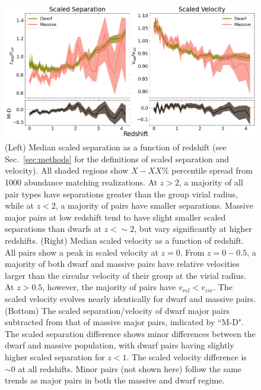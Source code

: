 \documentclass[twocolumn]{aastex631}
\begin{document}
\begin{figure}[htp]
  \centering
  \includegraphics[width=\textwidth]{scaledcombo_1000.png}
  \caption{
  (Left) Median scaled separation as a function of redshift (see Sec.~\ref{sec:methods} for the definitions of scaled separation and velocity). All shaded regions show $X-XX\%$ percentile spread from 1000 abundance matching realizations. 
  At $z>2$, a majority of all pair types have separations greater than the group virial radius, while at $z<2$, a majority of pairs have smaller separations.  
  Massive major pairs at low redshift tend to have slight smaller scaled separations than dwarfs at $z<\sim2$, but vary significantly at higher redshifts. 
  (Right) Median scaled velocity as a function of redshift.
  All pairs show a peak in scaled velocity at $z=0$. From $z=0-0.5$, a majority of both dwarf and massive pairs have relative velocities larger than the circular velocity of their group at the virial radius. At $z>0.5$, however, the majority of pairs have $v_{rel}<v_{vir}$. The scaled velocity evolves nearly identically for dwarf and massive pairs.
  (Bottom) The scaled separation/velocity of dwarf major pairs subtracted from that of massive major pairs, indicated by ``M-D".
  The scaled separation difference shows minor differences between the dwarf and massive population, with dwarf pairs having slightly higher scaled separation for $z<1$. The scaled velocity difference is $\sim0$ at all redshifts.
  Minor pairs (not shown here) follow the same trends as major pairs in both the massive and dwarf regime.
    }
  \label{fig:scaled}
\end{figure}
\end{document}
